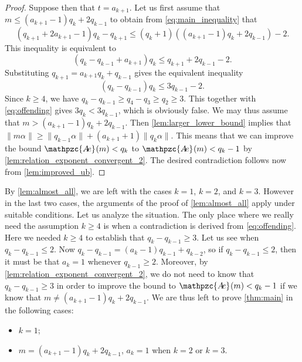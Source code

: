 \documentclass[a4paper,fleqn]{article}
\providecommand{\norm}[1]{\lVert#1\rVert}
\newcommand{\abexp}[2][]{\mathpzc{A\mkern-3mu e}_{#1}(#2)}
\begin{document}
\begin{proof}
    Suppose then that $t = a_{k+1}$. Let us first assume that $m \leq (a_{k+1}-1)q_k + 2q_{k-1}$ to obtain from
    \eqref{eq:main_inequality} that
    \begin{equation}\label{eq:offending_before}
      (q_{k+1} + 2a_{k+1} - 1)q_k - q_{k+1} \leq (q_k + 1)((a_{k+1}-1)q_k + 2q_{k-1}) - 2.
    \end{equation}
    This inequality is equivalent to
    \begin{equation*}
      (q_k - q_{k-1} + a_{k+1})q_k \leq q_{k+1} + 2q_{k-1} - 2.
    \end{equation*}
    Substituting $q_{k+1} = a_{k+1}q_k + q_{k-1}$ gives the equivalent inequality
    \begin{equation}\label{eq:offending}
      (q_k - q_{k-1})q_k \leq 3q_{k-1} - 2.
    \end{equation}
    Since $k \geq 4$, we have $q_k - q_{k-1} \geq q_4 - q_3 \geq q_2 \geq 3$. This together with \eqref{eq:offending}
    gives $3q_k < 3q_{k-1}$, which is obviously false. We may thus assume that $m > (a_{k+1}-1)q_k + 2q_{k-1}$. Then
    \autoref{lem:larger_lower_bound} implies that
    $\norm{m\alpha} \geq \norm{q_{k-1}\alpha} + (a_{k+1} + 1)\norm{q_k\alpha}$. This means that we can improve the bound
    $\abexp{m} < q_k$ to $\abexp{m} < q_k - 1$ by \autoref{lem:relation_exponent_convergent_2}. The desired
    contradiction follows now from \autoref{lem:improved_ub}.
  \end{proof}

  By \autoref{lem:almost_all}, we are left with the cases $k = 1$, $k = 2$, and $k = 3$. However in the last two cases,
  the arguments of the proof of \autoref{lem:almost_all} apply under suitable conditions. Let us analyze the situation.
  The only place where we really need the assumption $k \geq 4$ is when a contradiction is derived from
  \eqref{eq:offending}. Here we needed $k \geq 4$ to establish that $q_k - q_{k-1} \geq 3$. Let us see when
  $q_k - q_{k-1} \leq 2$. Now $q_k - q_{k-1} = (a_k - 1)q_{k-1} + q_{k-2}$, so if $q_k - q_{k-1} \leq 2$, then it must
  be that $a_k = 1$ whenever $q_{k-1} \geq 2$. Moreover, by \autoref{lem:relation_exponent_convergent_2}, we do not
  need to know that $q_k - q_{k-1} \geq 3$ in order to improve the bound to $\abexp{m} < q_k - 1$ if we know that
  $m \neq (a_{k+1} - 1)q_k + 2q_{k-1}$. We are thus left to prove \autoref{thm:main} in the following cases:
  \begin{itemize}
    \item $k = 1$;
    \item $m = (a_{k+1} - 1)q_k + 2q_{k-1}$, $a_k = 1$ when $k = 2$ or $k = 3$.
  \end{itemize}
\end{document}
